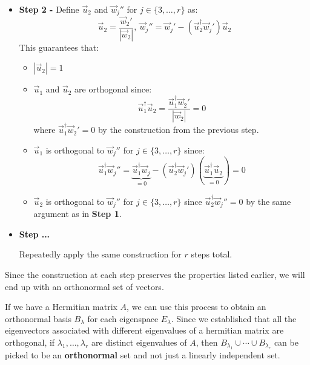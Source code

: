 \documentclass[../main.tex]{subfiles}
\begin{document}
\begin{itemize}
    Their span is preserved as every vector in $\{\vec{u}_1, \vec{w}_2', \ldots, \vec{w}_r'\}$ is a linear combination of vectors in $\{\vec{w}_1, \ldots, \vec{w}_r\}$.
    This also ensures that they are linearly independent as if we were unable to construct any of the vectors as a non-trivial linear combination of the others, we are still unable to after this first step as we are taking linear combinations of linear combinations of the original vectors which in itself is a linear combination of the original vectors.
  \item \textbf{Step 2 -} Define $\vec{u}_2$ and $\vec{w}_j''$ for $j \in \{3, \ldots, r\}$ as:
    \[
      \vec{u}_2 = \frac{\vec{w}_2'}{|\vec{w}_2|},\ \vec{w}_j'' = \vec{w}_j' - (\vec{u}^{\dag}_{2}\vec{w}_j')\vec{u}_2
    \]
    This guarantees that:
    \begin{itemize}
      \item $|\vec{u}_2| = 1$
      \item $\vec{u}_1$ and $\vec{u}_2$ are orthogonal since:
        \[
          \vec{u}^{\dag}_{1}\vec{u}_2 = \frac{\vec{u}^{\dag}_{1}\vec{w}_2'}{|\vec{w}_2|} = 0
        \]
        where $\vec{u}^{\dag}_{1}\vec{w}_2' = 0$ by the construction from the previous step.
      \item $\vec{u}_1$ is orthogonal to $\vec{w}_j''$ for $j \in \{3, \ldots, r\}$ since:
        \[
          \vec{u}^{\dag}_{1}\vec{w}_j'' = \underbrace{\vec{u}^{\dag}_{1}\vec{w}_j}_{=0} -(\vec{u}^{\dag}_{2}\vec{w}_j')(\underbrace{\vec{u}^{\dag}_{1}\vec{u}_2}_{=0}) =0
        \]
      \item $\vec{u}_2$ is orthogonal to $\vec{w}_j''$ for $j \in \{3, \ldots, r\}$ since $\vec{u}^{\dag}_{2}\vec{w}_j'' = 0$ by the same argument as in \textbf{Step 1}.
    \end{itemize}
  \item \textbf{Step ...}\par
    Repeatedly apply the same construction for $r$ steps total.
\end{itemize}
Since the construction at each step preserves the properties listed earlier, we will end up with an orthonormal set of vectors.

If we have a Hermitian matrix $A$, we can use this process to obtain an orthonormal basis $B_\lambda$ for each eigenspace $E_\lambda$.
Since we established that all the eigenvectors associated with different eigenvalues of a hermitian matrix are orthogonal, if $\lambda_1, \ldots, \lambda_r$ are distinct eigenvalues of $A$, then $B_{\lambda_1} \cup \cdots \cup B_{\lambda_r}$ can be picked to be an \textbf{orthonormal} set and not just a linearly independent set.
\end{document}
